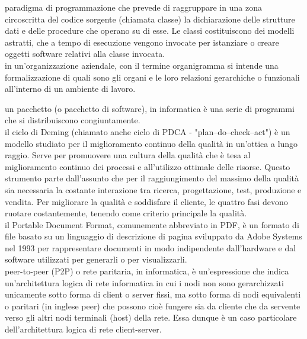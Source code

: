 \documentclass{scalatekids-article}
\begin{document}

   paradigma di programmazione che prevede di raggruppare in una zona circoscritta del codice sorgente (chiamata classe) la dichiarazione delle strutture dati e delle procedure che operano su di esse. Le classi costituiscono dei modelli astratti, che a tempo di esecuzione vengono invocate per istanziare o creare oggetti software relativi alla classe invocata.
  \\

   in un'organizzazione aziendale, con il termine organigramma si intende una formalizzazione di quali sono gli organi e le loro relazioni gerarchiche o funzionali all'interno di un ambiente di lavoro.
  \\


   un pacchetto (o pacchetto di software), in informatica è una serie di programmi che si distribuiscono congiuntamente.
  \\

   il ciclo di Deming (chiamato anche ciclo di PDCA - "plan–do–check–act") è un modello studiato per il miglioramento continuo della qualità in un'ottica a lungo raggio. Serve per promuovere una cultura della qualità che è tesa al miglioramento continuo dei processi e all'utilizzo ottimale delle risorse. Questo strumento parte dall'assunto che per il raggiungimento del massimo della qualità sia necessaria la costante interazione tra ricerca, progettazione, test, produzione e vendita. Per migliorare la qualità e soddisfare il cliente, le quattro fasi devono ruotare costantemente, tenendo come criterio principale la qualità.
  \\

   il Portable Document Format, comunemente abbreviato in PDF, è un formato di file basato su un linguaggio di descrizione di pagina sviluppato da Adobe Systems nel 1993 per rappresentare documenti in modo indipendente dall'hardware e dal software utilizzati per generarli o per visualizzarli.
  \\
  
   peer-to-peer (P2P) o rete paritaria, in informatica, è un'espressione che indica un'architettura logica di rete informatica in cui i nodi non sono gerarchizzati unicamente sotto forma di client o server fissi, ma sotto forma di nodi equivalenti o paritari (in inglese peer) che possono cioè fungere sia da cliente che da servente verso gli altri nodi terminali (host) della rete. Essa dunque è un caso particolare dell'architettura logica di rete client-server.
\end{document}
